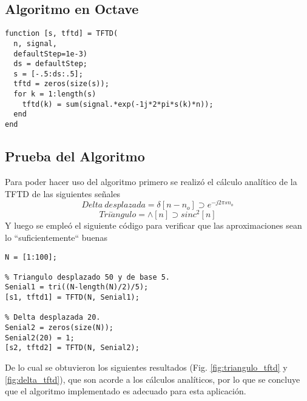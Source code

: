 \documentclass[letterpaper, 10 pt, conference]{ieeeconf}  %
\begin{document}
\subsection{Algoritmo en Octave}
\begin{lstlisting}[style=Matlab-editor]
function [s, tftd] = TFTD(
  n, signal,
  defaultStep=1e-3)
  ds = defaultStep;
  s = [-.5:ds:.5];
  tftd = zeros(size(s));
  for k = 1:length(s)
    tftd(k) = sum(signal.*exp(-1j*2*pi*s(k)*n));
  end
end
\end{lstlisting}

\subsection{Prueba del Algoritmo}
Para poder hacer uso del algoritmo primero se realiz\'o el c\'alculo analítico de la TFTD de las siguientes se\~{n}ales
\[
  Delta\ desplazada = \delta[n-n_o] \supset e^{-j2{\pi}sn_o}
\]
\[
  Tri\acute{a}ngulo = \wedge[n] \supset sinc^2[n]
\]
Y luego se emple\'o el siguiente c\'odigo para verificar que las aproximaciones sean lo ``suficientemente`` buenas

\begin{lstlisting}[style=Matlab-editor]
N = [1:100];

% Triangulo desplazado 50 y de base 5.
Senial1 = tri((N-length(N)/2)/5);
[s1, tftd1] = TFTD(N, Senial1);

% Delta desplazada 20.
Senial2 = zeros(size(N));
Senial2(20) = 1;
[s2, tftd2] = TFTD(N, Senial2);
\end{lstlisting}

De lo cual se obtuvieron los siguientes resultados (Fig. \ref{fig:triangulo_tftd} y \ref{fig:delta_tftd}), que son acorde a los c\'alculos analíticos, por lo que se concluye que el algoritmo implementado es adecuado para esta aplicaci\'on.
\end{document}
